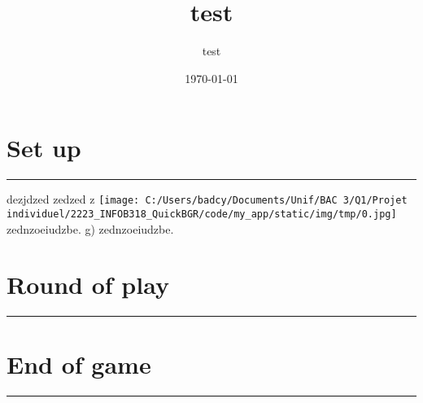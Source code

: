 \documentclass{scrartcl}%
\title{test}%
\author{test}%
\date{\today}%
\begin{document}
%
\normalsize%
\maketitle\thispagestyle{header}%
\pagestyle{header}%
\sectionfont{\color{blue}}%
\subsectionfont{\color{blue}}%
\subsubsectionfont{\color{blue}}%
\section{ Set up
}%
\label{sec:Setup}%
\textcolor{blue}{\rule{18cm}{0.07cm}}\break%
dezjdzed zedzed z%
\texttt{[image: C:/Users/badcy/Documents/Unif/BAC 3/Q1/Projet individuel/2223\_INFOB318\_QuickBGR/code/my\_app/static/img/tmp/0.jpg]}%
 zednzoeiudzbe.
%
g) zednzoeiudzbe.


%
\sectionfont{\color{mygreen}}%
\subsectionfont{\color{mygreen}}%
\subsubsectionfont{\color{mygreen}}%
\section{ Round of play
}%
\label{sec:Roundofplay}%
\textcolor{mygreen}{\rule{18cm}{0.07cm}}\break

%
\sectionfont{\color{red}}%
\subsectionfont{\color{red}}%
\subsubsectionfont{\color{red}}%
\section{ End of game}%
\label{sec:Endofgame}%
\textcolor{red}{\rule{18cm}{0.07cm}}\break

%
\end{document}
